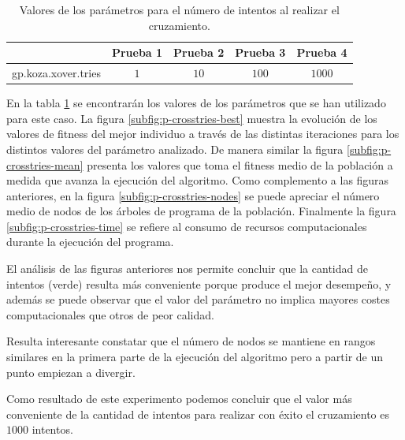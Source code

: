 \begin{table}[tb]
\caption{Valores de los parámetros para el número de intentos al realizar el
cruzamiento.}
\label{tab:cross-tries}
\centering
\begin{tabular}{lcccc}
\toprule
  &\textbf{Prueba 1} & \textbf{Prueba 2} & \textbf{Prueba 3} &\textbf{Prueba
  4}\\
\midrule
gp.koza.xover.tries    & $1$ & $10$ & $100$ & $1000$ \\
\bottomrule
\end{tabular}
\end{table}


En la tabla \ref{tab:cross-tries} se encontrarán los valores de los parámetros
que se han utilizado para este caso. La figura \ref{subfig:p-crosstries-best}
muestra la evolución de los valores de fitness del mejor individuo a través de
las distintas iteraciones para los distintos valores del parámetro analizado. De
manera similar la figura \ref{subfig:p-crosstries-mean} presenta los valores que
toma el fitness medio de la población a medida que avanza la ejecución del
algoritmo. Como complemento a las figuras anteriores, en la figura
\ref{subfig:p-crosstries-nodes} se puede apreciar el número medio de nodos de los
árboles de programa de la población. Finalmente la figura
\ref{subfig:p-crosstries-time}  se refiere al consumo de recursos
computacionales durante la ejecución del programa.


El análisis de las figuras anteriores nos permite concluir que la cantidad de
intentos (verde) resulta más conveniente porque produce el mejor desempeño, y
además se puede observar que el valor del parámetro no implica mayores costes
computacionales que otros de peor calidad.

Resulta interesante constatar que el número de nodos se mantiene en rangos
similares en la primera parte de la ejecución del algoritmo pero a partir de un
punto empiezan a divergir.

Como resultado de este experimento podemos concluir que el valor más conveniente
de la cantidad de intentos para realizar con éxito el cruzamiento es $1000$
intentos.


